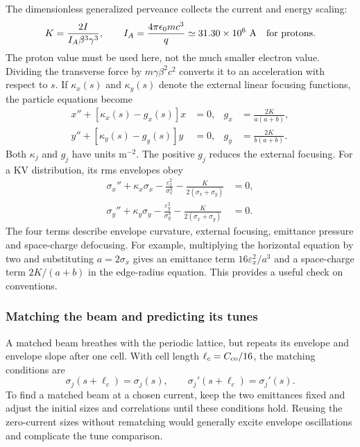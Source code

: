 The dimensionless generalized perveance collects the current and energy
scaling:
\begin{equation}
 K=\frac{2I}{I_A\beta^3\gamma^3},\qquad
 I_A=\frac{4\pi\epsilon_0mc^3}{q}
      \simeq31.30\times10^6\ \mathrm{A}\quad\hbox{for protons}.
 \label{eq:sc-perveance}
\end{equation}
The proton value must be used here, not the much smaller electron value.
Dividing the transverse force by $m\gamma\beta^2c^2$ converts it to an
acceleration with respect to $s$. If $\kappa_x(s)$ and $\kappa_y(s)$ denote
the external linear focusing functions, the particle equations become
\begin{equation}
 \begin{aligned}
 x''+[\kappa_x(s)-g_x(s)]x&=0,&g_x&=\frac{2K}{a(a+b)},\\
 y''+[\kappa_y(s)-g_y(s)]y&=0,&g_y&=\frac{2K}{b(a+b)}.
 \end{aligned}
 \label{eq:sc-particle}
\end{equation}
Both $\kappa_j$ and $g_j$ have units m$^{-2}$. The positive $g_j$ reduces the
external focusing. For a KV distribution, its rms envelopes obey
\begin{equation}
 \boxed{\begin{aligned}
 \sigma_x''+\kappa_x\sigma_x-\frac{\varepsilon_x^2}{\sigma_x^3}
                   -\frac{K}{2(\sigma_x+\sigma_y)}&=0,\\
 \sigma_y''+\kappa_y\sigma_y-\frac{\varepsilon_y^2}{\sigma_y^3}
                   -\frac{K}{2(\sigma_x+\sigma_y)}&=0.
 \end{aligned}}
 \label{eq:sc-envelopes}
\end{equation}
The four terms describe envelope curvature, external focusing, emittance
pressure and space-charge defocusing. For example, multiplying the horizontal
equation by two and substituting $a=2\sigma_x$ gives an emittance term
$16\varepsilon_x^2/a^3$ and a space-charge term $2K/(a+b)$ in the edge-radius
equation. This provides a useful check on conventions.

\subsubsection{Matching the beam and predicting its tunes}
A matched beam breathes with the periodic lattice, but repeats its envelope
and envelope slope after one cell. With cell length $\ell_c=C_{\rm co}/16$,
the matching conditions are
\begin{equation}
 \sigma_j(s+\ell_c)=\sigma_j(s),\qquad
 \sigma_j'(s+\ell_c)=\sigma_j'(s).
 \label{eq:sc-match}
\end{equation}
To find a matched beam at a chosen current, keep the two emittances fixed and
adjust the initial sizes and correlations until these conditions hold. Reusing
the zero-current sizes without rematching would generally excite envelope
oscillations and complicate the tune comparison.

